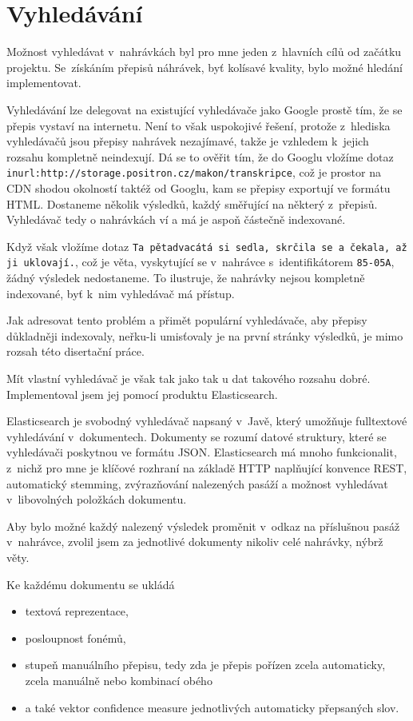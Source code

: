 \chapter{Vyhledávání}
\label{kap:vyhledavani}

Možnost vyhledávat v~nahrávkách byl pro mne jeden z~hlavních cílů od začátku
projektu. Se~získáním přepisů náhrávek, byť kolísavé kvality, bylo možné hledání
implementovat.

Vyhledávání lze delegovat na existující vyhledávače jako Google
prostě tím, že se přepis vystaví na internetu. Není to však uspokojivé řešení,
protože z~hlediska vyhledávačů jsou přepisy nahrávek nezajímavé, takže je
vzhledem k~jejich rozsahu kompletně neindexují. Dá se to ověřit tím, že do
Googlu vložíme dotaz
\texttt{inurl:http://storage.positron.cz/makon/transkripce}, což je prostor na
CDN shodou okolností taktéž od Googlu, kam se přepisy exportují ve formátu HTML.
Dostaneme několik výsledků, každý směřující na některý z~přepisů. Vyhledávač
tedy o nahrávkách ví a má je aspoň částečně indexované.

Když však vložíme dotaz \texttt{Ta pětadvacátá si sedla, skrčila se a čekala, až
ji uklovají.}, což je věta, vyskytující se v~nahrávce s~identifikátorem
\texttt{85-05A}, žádný výsledek nedostaneme. To ilustruje, že nahrávky nejsou
kompletně indexované, byť k~nim vyhledávač má přístup.

Jak adresovat tento problém a přimět populární vyhledávače, aby přepisy
důkladněji indexovaly, neřku-li umisťovaly je na první stránky výsledků, je mimo
rozsah této disertační práce.

Mít vlastní vyhledávač je však tak jako tak u dat takového rozsahu dobré.
Implementoval jsem jej pomocí produktu Elasticsearch.

Elasticsearch je svobodný vyhledávač napsaný v~Javě, který umožňuje fulltextové
vyhledávání v~dokumentech. Dokumenty se rozumí datové struktury, které se
vyhledávači poskytnou ve formátu JSON. Elasticsearch má mnoho funkcionalit,
z~nichž pro mne je klíčové rozhraní na základě HTTP naplňující konvence REST,
automatický stemming, zvýrazňování nalezených pasáží a možnost vyhledávat
v~libovolných položkách dokumentu.

Aby bylo možné každý nalezený výsledek proměnit v~odkaz na příslušnou pasáž
v~nahrávce, zvolil jsem za jednotlivé dokumenty nikoliv celé nahrávky, nýbrž
věty.

Ke každému dokumentu se ukládá
\begin{itemize}
\item{textová reprezentace,}
\item{posloupnost fonémů,}
\item{stupeň
manuálního přepisu, tedy zda je přepis pořízen zcela automaticky, zcela manuálně
nebo kombinací obého}
\item{a také vektor confidence measure jednotlivých automaticky přepsaných slov.}
\end{itemize}


